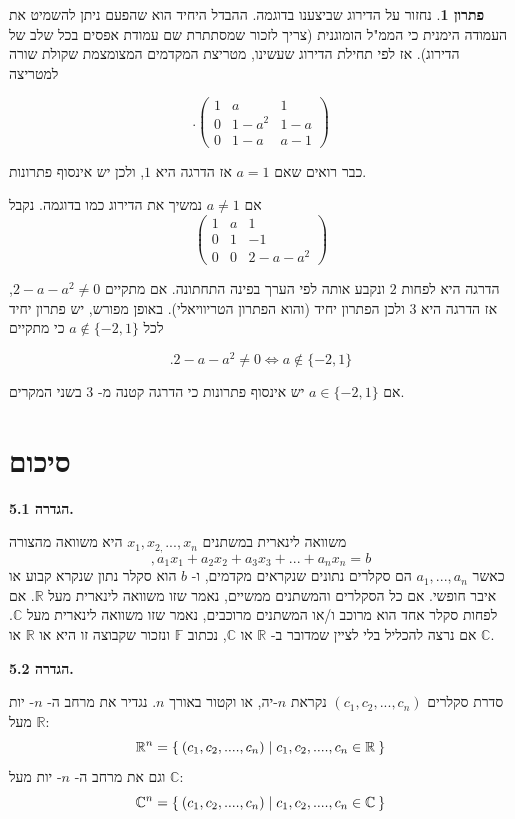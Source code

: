 \documentclass[12pt]{report}
\theoremstyle{plain}
\theoremstyle{definition}
\newtheorem*{solution}{פתרון}
\newcommand{\R}{\mathbb{R}}
\newcommand{\C}{\mathbb{C}}
\newcommand{\F}{\mathbb{F}}
\newcommand{\0}{\mathbf{0}}
\begin{document}
\begin{solution}
נחזור על הדירוג שביצענו בדוגמה. ההבדל היחיד הוא שהפעם ניתן להשמיט את העמודה הימנית כי הממ"ל הומוגנית (צריך לזכור שמסתתרת שם עמודת אפסים בכל שלב של הדירוג). אז לפי תחילת הדירוג שעשינו, מטריצת המקדמים המצומצמת שקולת שורה למטריצה

$$
.\begin{pmatrix}
1 & a & 1  \\
0 & 1-a^2 & 1-a \\
0 & 1-a & a-1 
\end{pmatrix}
$$

כבר רואים שאם
$a=1$
אז הדרגה היא 
$1$,
ולכן יש אינסוף פתרונות.

אם
$a\neq 1$
נמשיך את הדירוג כמו בדוגמה. נקבל
$$
\begin{pmatrix}
1 & a & 1  \\
0 & 1 & -1 \\
0 & 0 & 2-a-a^2 
\end{pmatrix}
$$

הדרגה היא לפחות 
$2$
ונקבע אותה לפי הערך בפינה התחתונה. אם מתקיים
$2-a-a^2\neq 0$, 
אז הדרגה היא
$3$
ולכן הפתרון יחיד (והוא הפתרון הטריוויאלי). באופן מפורש, יש פתרון יחיד לכל 
$a\notin\{-2,1\}$
כי מתקיים

$$
.2-a-a^2\neq 0 \iff a\notin\{-2,1\}
$$

אם
$a\in\{-2,1\}$
יש אינסוף פתרונות כי הדרגה קטנה מ-
$3$
בשני המקרים.

\end{solution}

\clearpage
\section{סיכום}

\noindent\textbf{הגדרה 5.1.}

משוואה לינארית במשתנים
$x_1,x_{2,}...,x_n$
היא משוואה מהצורה
\begin{equation*}
,a_1x_1+a_2x_2+a_3x_3+...+a_nx_n=b
\end{equation*}
כאשר
$a_1,...,a_n$
הם סקלרים נתונים שנקראים מקדמים, ו-
$b$
הוא סקלר נתון שנקרא קבוע או איבר חופשי. אם כל הסקלרים והמשתנים ממשיים,
נאמר שזו משוואה לינארית מעל
$\R$.
אם לפחות סקלר אחד הוא מרוכב ו/או המשתנים מרוכבים, נאמר שזו משוואה לינארית מעל
$\C$.
אם נרצה להכליל בלי לציין שמדובר ב-
$\R$ או $\C$,
נכתוב
$\F$
ונזכור שקבוצה זו היא או
$\R$
או
$\C$.
\bigskip
\bigskip

\noindent\textbf{הגדרה 5.2.}

סדרת סקלרים
$(c_1,c_2,...,c_n)$
נקראת
$n$-יה,
או וקטור באורך
$n$.
נגדיר את מרחב ה-
$n$-
יות מעל
$\R$:
$$
\R^{n}=\Set{(c_1,c_2,....,c_n)|c_1,c_2,....,c_n\in\R}
$$
 וגם את מרחב ה-
 $n$-
 יות מעל
 $\C$:
$$
\C^{n}=\Set{(c_1,c_2,....,c_n)|c_1,c_2,....,c_n\in\C}
$$
\end{document}
